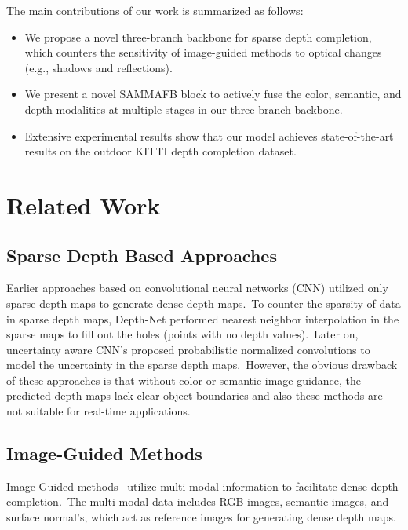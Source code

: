 \documentclass{ieeeaccess}
\begin{document}
The main contributions of our work is summarized as follows:
\begin{itemize}
  \item We propose a novel three-branch backbone for sparse depth completion, which counters the sensitivity of image-guided methods to optical changes (e.g., shadows and reflections).
  \item We present a novel SAMMAFB block to actively fuse the color, semantic, and depth modalities at multiple stages in our three-branch backbone.
  \item Extensive experimental results show that our model achieves state-of-the-art results on the outdoor KITTI depth completion dataset.
  
\end{itemize}


\section{Related Work}

\subsection{Sparse Depth Based Approaches}
Earlier approaches \cite{KITTI, chodosh2018deep} based on convolutional neural networks (CNN) utilized only sparse depth maps to generate dense depth maps.~To counter the sparsity of data in sparse depth maps, Depth-Net \cite{bai2020depthnet} performed nearest neighbor interpolation in the sparse maps to fill out the holes (points with no depth values).~Later on, uncertainty aware CNN's \cite{eldesokey2020uncertainty} proposed probabilistic normalized convolutions to model the uncertainty in the sparse depth maps.~However, the obvious drawback of these approaches is that without color or semantic image guidance, the predicted depth maps lack clear object boundaries and also these methods are not suitable for real-time applications.
 

 
\subsection{Image-Guided Methods}

Image-Guided methods~\cite{park2020non,tang2020learning,hu2020PENet,yan2021rignet,zhao2021adaptive,liu2021fcfr,cheng2020cspn++,dspn,gu2021denselidar,cheng2018depth,liu2017learning} utilize multi-modal information to facilitate dense depth completion.~The multi-modal data includes RGB images, semantic images, and surface normal's, which act as reference images for generating dense depth maps.
\end{document}
